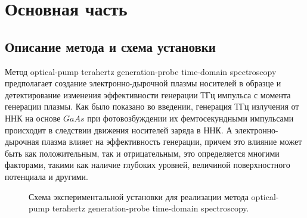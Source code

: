 \documentclass[a4paper,14pt,russian]{extreport}
\begin{document}
	\chapter{Основная часть}
		\section{Описание метода и схема установки}\label{installation}
			Метод optical-pump terahertz generation-probe time-domain spectroscopy предполагает создание электронно-дырочной плазмы носителей в образце и детектирование изменения эффективности генерации ТГц импульса с момента генерации плазмы. Как было показано во введении, генерация ТГц излучения от ННК на основе $GaAs$ при фотовозбуждении их фемтосекундными импульсами происходит в следствии движения носителей заряда в ННК. А электронно-дырочная плазма влияет на эффективность генерации, причем это влияние может быть как положительным, так и отрицательным, это определяется многими факторами, такими как наличие глубоких уровней, величиной поверхностного потенциала и другими.\par
				\begin{figure}[h]
					\caption{Схема экспериментальной установки для реализации метода optical-pump terahertz generation-probe time-domain spectroscopy.}
				\label{ris:Scheme}
				\end{figure}
\end{document}
